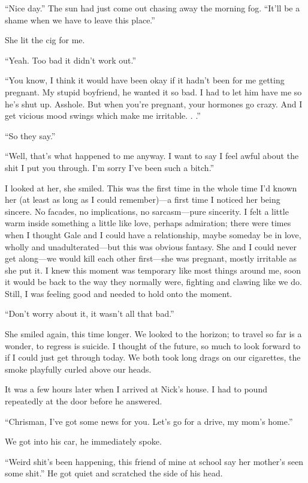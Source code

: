 ``Nice day.'' The sun had just come out chasing away the morning fog.
``It'll be a shame when we have to leave this place.''

She lit the cig for me.

``Yeah. Too bad it didn't work out.''

``You know, I think it would have been okay if it hadn't been for me
getting pregnant. My stupid boyfriend, he wanted it so bad. I had to let
him have me so he's shut up. Asshole. But when you're pregnant, your
hormones go crazy. And I get vicious mood swings which make me
irritable. . .''

``So they say.''

``Well, that's what happened to me anyway. I want to say I feel awful
about the shit I put you through. I'm sorry I've been such a bitch.''

I looked at her, she smiled. This was the first time in the whole time
I'd known her (at least as long as I could remember)---a first time I
noticed her being sincere. No facades, no implications, no
sarcasm---pure sincerity. I felt a little warm inside something a little
like love, perhaps admiration; there were times when I thought Gale and
I could have a relationship, maybe someday be in love, wholly and
unadulterated---but this was obvious fantasy. She and I could never get
along---we would kill each other first---she was pregnant, mostly
irritable as she put it. I knew this moment was temporary like most
things around me, soon it would be back to the way they normally were,
fighting and clawing like we do. Still, I was feeling good and needed to
hold onto the moment.

``Don't worry about it, it wasn't all that bad.''

She smiled again, this time longer. We looked to the horizon; to travel
so far is a wonder, to regress is suicide. I thought of the future, so
much to look forward to if I could just get through today. We both took
long drags on our cigarettes, the smoke playfully curled above our
heads.

It was a few hours later when I arrived at Nick's house. I had to pound
repeatedly at the door before he answered.

``Chrisman, I've got some news for you. Let's go for a drive, my mom's
home.''

We got into his car, he immediately spoke.

``Weird shit's been happening, this friend of mine at school say her
mother's seen some shit.'' He got quiet and scratched the side of his
head.

